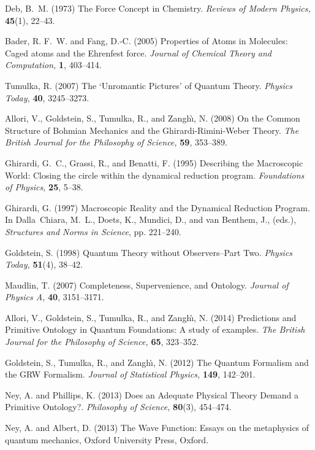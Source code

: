 \documentclass[12pt,onecolumn,secnumarabic,amsmath,amssymb,balancelastpage,nofootinbib]{article}
\begin{document}
\begin{thebibliography}{100}
Deb, B.~M. (1973)
The Force Concept in Chemistry.
{\em Reviews of Modern Physics,} {\bf 45}(1), 22--43.

Bader, R. F.~W. and Fang, D.-C. (2005)
Properties of Atoms in Molecules: Caged atoms and the Ehrenfest force.
{\em Journal of Chemical Theory and Computation,} {\bf 1}, 403--414.

Tumulka, R. (2007)
The `Unromantic Pictures' of Quantum Theory.
{\em Physics Today,} {\bf 40}, 3245--3273.

Allori, V., Goldstein, S., Tumulka, R., and Zangh\`{\i}, N. (2008)
On the Common Structure of Bohmian Mechanics and the Ghirardi-Rimini-Weber
  Theory.
{\em The British Journal for the Philosophy of Science,} {\bf 59}, 353--389.

Ghirardi, G.~C., Grassi, R., and Benatti, F. (1995)
Describing the Macroscopic World: Closing the circle within the dynamical
  reduction program.
{\em Foundations of Physics,} {\bf 25}, 5--38.

Ghirardi, G. (1997)
Macroscopic Reality and the Dynamical Reduction Program.
In Dalla~Chiara, M.~L., Doets, K., Mundici, D., and van Benthem, J., (eds.),
  \emph{Structures and Norms in Science},  pp. 221--240.

Goldstein, S. (1998)
Quantum Theory without Observers--Part Two.
{\em Physics Today,} {\bf 51}(4), 38--42.

Maudlin, T. (2007)
Completeness, Supervenience, and Ontology.
{\em Journal of Physics A,} {\bf 40}, 3151--3171.

Allori, V., Goldstein, S., Tumulka, R., and Zangh\`{\i}, N. (2014)
Predictions and Primitive Ontology in Quantum Foundations: A study of examples.
{\em The British Journal for the Philosophy of Science,} {\bf 65}, 323--352.

Goldstein, S., Tumulka, R., and Zangh\`{\i}, N. (2012)
The Quantum Formalism and the GRW Formalism.
{\em Journal of Statistical Physics,} {\bf 149}, 142--201.

Ney, A. and Phillips, K. (2013)
Does an Adequate Physical Theory Demand a Primitive Ontology?.
{\em Philosophy of Science,} {\bf 80}(3), 454--474.

Ney, A. and Albert, D. (2013)
The Wave Function: Essays on the metaphysics of quantum mechanics,
Oxford University Press, Oxford.


\end{thebibliography}
\end{document}
